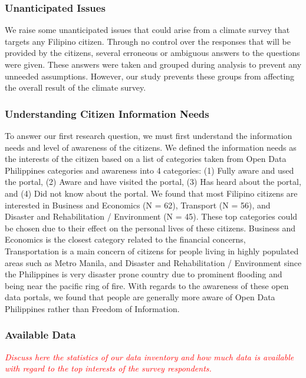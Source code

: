 \documentclass{sigchi}
\begin{document}
\subsubsection{Unanticipated Issues}
We raise some unanticipated issues that could arise from a climate survey that targets any Filipino citizen. Through no control over the responses that will be provided by the citizens, several erroneous or ambiguous answers to the questions were given. These answers were taken and grouped during analysis to prevent any unneeded assumptions. However, our study prevents these groups from affecting the overall result of the climate survey.

\subsubsection{Understanding Citizen Information Needs}
To answer our first research question, we must first understand the information needs and level of awareness of the citizens. We defined the information needs as the interests of the citizen based on a list of categories taken from Open Data Philippines categories and awareness into 4 categories: (1) Fully aware and used the portal, (2) Aware and have visited the portal, (3) Has heard about the portal, and (4) Did not know about the portal. We found that most Filipino citizens are interested in Business and Economics (N = 62), Transport (N = 56), and Disaster and Rehabilitation / Environment (N = 45). These top categories could be chosen due to their effect on the personal lives of these citizens. Business and Economics is the closest category related to the financial concerns, Transportation is a main concern of citizens for people living in highly populated areas such as Metro Manila, and Disaster and Rehabilitation / Environment since the Philippines is very disaster prone country due to prominent flooding and being near the pacific ring of fire. With regards to the awareness of these open data portals, we found that people are generally more aware of Open Data Philippines rather than Freedom of Information. 


\subsubsection{Available Data}
\textit{\textcolor{red}{Discuss here the statistics of our data inventory and how much data is available with regard to the top interests of the survey respondents.}}
\end{document}
